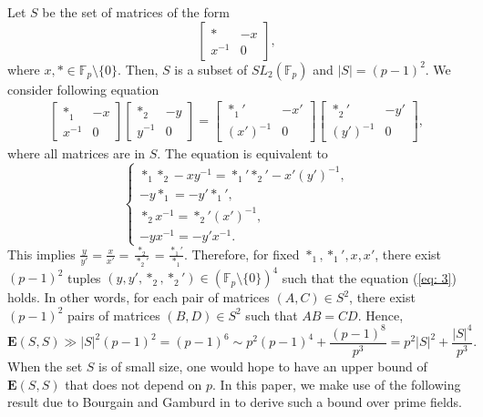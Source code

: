 \documentclass[11pt]{article}
\def\Fbb{\mathbb{F}}
\def\Ebf{\textbf{E}}
\def\SL{SL}
\def\l({\left(}
\def\r){\right)}
\def\lv{\left\vert}
\def\rv{\right\vert}
\begin{document}
  Let $S$ be the set of matrices of the form
    \[ \begin{bmatrix}
        \ast & -x \\
        x^{-1} & 0
    \end{bmatrix}, \]
    where $x,\ast \in \Fbb_p \setminus \{ 0 \}$. Then, $S$ is a subset of $\SL_2 \l( \Fbb_p \r)$ and $\lv S\rv =(p-1)^2$. We consider following equation
    \begin{align}\label{eq: 3}
        \begin{bmatrix}
        \ast_1 & -x \\
        x^{-1} & 0
    \end{bmatrix} \begin{bmatrix}
        \ast_2 & -y \\
        y^{-1} & 0
    \end{bmatrix} =  \begin{bmatrix}
        \ast_1' & -x' \\
        (x')^{-1} & 0
    \end{bmatrix} 
    \begin{bmatrix}
        \ast_2' & -y' \\
        (y')^{-1} & 0
    \end{bmatrix},
    \end{align} 
    where all matrices are in $S$. The equation is equivalent to 
    \[ \begin{cases}
        \ast_1 \ast_2 -xy^{-1} = \ast_1' \ast_2 ' -x'(y')^{-1}, \\
        -y\ast_1 = -y' \ast_1' ,\\
        \ast_2 x^{-1} =\ast_2'(x')^{-1} ,\\
        -yx^{-1} =-y' x^{-1}.
    \end{cases} \]
    This implies $\frac{y}{y'}=\frac{x}{x'}=\frac{\ast_2}{\ast_2'}=\frac{\ast_1'}{\ast_1}$. Therefore, for fixed $\ast_1 , \ast_1' ,x,x'$, there exist $(p-1)^2$ tuples $\l( y,y',\ast_2,\ast_2' \r) \in \l( \Fbb_p \setminus \{ 0\} \r)^4$ such that the equation (\ref{eq: 3}) holds. In other words, for each pair of matrices $(A,C) \in S^2$, there exist $(p-1)^2$ pairs of matrices $(B,D) \in S^2$ such that $AB=CD$. Hence,
    \[ \Ebf (S,S) \gg \lv S\rv^2 (p-1)^2 =(p-1)^6 \sim p^2 (p-1)^4 + \frac{(p-1)^8}{p^3} = p^2\lv S\rv^2 + \frac{\lv S\rv^4}{p^3}. \]
When the set $S$ is of small size, one would hope to have an upper bound of $\Ebf(S, S)$ that does not depend on $p$. In this paper, we make use of the following result due to Bourgain and Gamburd in \cite{B.A.08} to derive such a bound over prime fields.
\end{document}
